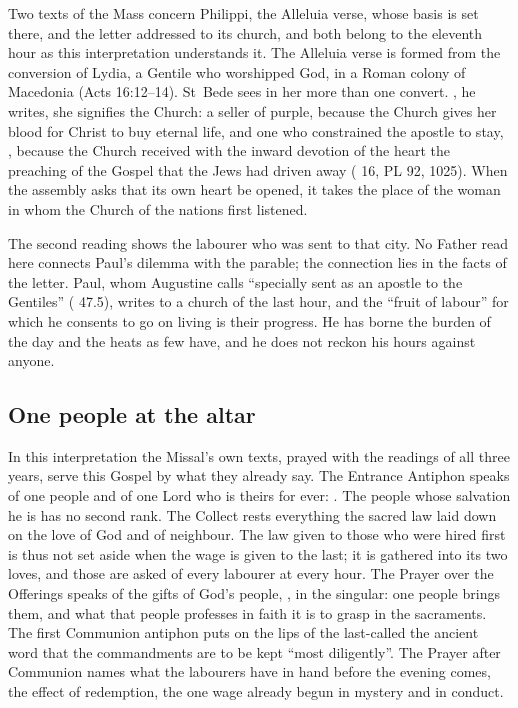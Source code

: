 Two texts of the Mass concern Philippi, the Alleluia verse, whose basis is set
there, and the letter addressed to its church, and both belong to the eleventh
hour as this interpretation understands it. The Alleluia verse is formed from
the conversion of Lydia, a
Gentile who worshipped God, in a Roman colony of Macedonia (Acts 16:12--14).
St~Bede sees in her more than one convert. , he writes, she signifies the Church: a seller of purple, because
the Church gives her blood for Christ to buy eternal life, and one who
constrained the apostle to stay, , because the Church
received with the inward devotion of the heart the preaching of the Gospel
that the Jews had driven away ( 16, PL
92, 1025). When the assembly asks that its own heart be opened, it takes the
place of the woman in whom the Church of the nations first listened.

The second reading shows the labourer who was sent to that city. No Father
read here connects Paul's dilemma with the parable; the connection lies in the
facts of the letter. Paul, whom Augustine calls ``specially sent as an apostle
to the Gentiles'' ( 47.5), writes to a
church of the last hour, and the ``fruit of labour'' for which he consents to
go on living is their progress. He has borne the burden of the day and the
heats as few have, and he does not reckon his hours against anyone.

\subsection{One people at the altar}

In this interpretation the Missal's own texts, prayed with the readings of all
three years, serve this Gospel by what they already say. The Entrance Antiphon speaks of one people and
of one Lord who is theirs for ever: . The people whose
salvation he is has no second rank. The Collect rests everything the sacred law
laid down on the love of God and of neighbour. The law given to those who were
hired first is thus not set aside when the wage is given to the last; it is
gathered into its two loves, and those are asked of every labourer at every
hour. The Prayer over the Offerings speaks of the gifts of God's people,
, in the singular: one people brings them, and what that
people professes in faith it is to grasp in the sacraments. The first Communion
antiphon puts on the lips of the last-called the ancient word that the
commandments are to be kept ``most diligently''. The Prayer after Communion
names what the labourers have in hand before the evening comes, the effect of
redemption, the one wage already begun in mystery and in conduct.

